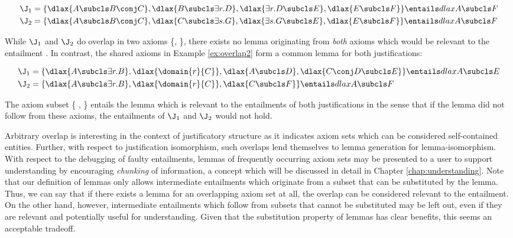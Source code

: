 \begin{examp}
\begin{align*}
\J_{1} = \{ & \dlax{A \subcls B \conj C}, \dlax{B \subcls \exists r.D}, \dlax{\exists r.D \subcls E},  \dlax{E \subcls F} \} \entails dlax{A \subcls F} \\
\J_{2} = \{ & \dlax{A \subcls B \conj C}, \dlax{C \subcls \exists s.G}, \dlax{\exists s.G \subcls E}, \dlax{E \subcls F}  \} \entails dlax{A \subcls F}
\end{align*}\label{ex:overlap}
\end{examp}

While $\J_{1}$ and $\J_{2}$ do overlap in two axioms \{, \}, there exists no lemma originating from \emph{both} axioms which would be relevant to the entailment . In contrast, the shared axioms in Example \ref{ex:overlap2} form a common lemma for both justifications:

\begin{examp}
\begin{align*}
\J_{1} = \{ & \dlax{A \subcls \exists r.B}, \dlax{\domain{r}{C}}, \dlax{A \subcls D},  \dlax{C \conj D \subcls E} \} \entails dlax{A \subcls E} \\
\J_{2} = \{ & \dlax{A \subcls \exists r.B}, \dlax{\domain{r}{C}},  \dlax{C  \subcls F} \} \entails dlax{A \subcls F}
\end{align*}\label{ex:overlap2}
\end{examp}

The axiom subset \{ ,  \} entails the lemma  which is relevant to the entailments of both justifications in the sense that if the lemma did not follow from these axioms, the entailments of $\J_{1}$ and $\J_{2}$ would not hold. 

Arbitrary overlap is interesting in the context of justificatory structure as it indicates axiom sets which can be considered self-contained entities. Further, with respect to justification isomorphism, such overlaps lend themselves to lemma generation for lemma-isomorphism. With respect to the debugging of faulty entailments, lemmas of frequently occurring axiom sets may be presented to a user to support understanding by encouraging \emph{chunking} of information, a concept which will be discussed in detail in Chapter \ref{chap:understanding}. Note that our definition of lemmas only allows intermediate entailments which originate from a subset that can be substituted by the lemma. Thus, we can say that if there exists a lemma for an overlapping axiom set at all, the overlap can be considered relevant to the entailment. On the other hand, however, intermediate entailments which follow from subsets that cannot be substituted may be left out, even if they are relevant and potentially useful for understanding. Given that the substitution property of lemmas has clear benefits, this seems an acceptable tradeoff.





